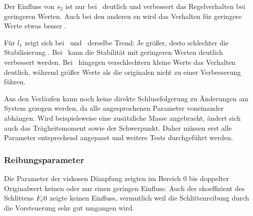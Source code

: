 Der Einfluss von $s_2$ ist nur bei \apd\ deutlich und verbessert das Regelverhalten bei geringeren Werten.
Auch bei den anderen \ap en wird das Verhalten für geringere Werte etwas besser .

Für $l_1$ zeigt sich bei \apz\ und \apd\ derselbe Trend: Je größer, desto schlechter die Stabilisierung .
Bei \apz\ kann die Stabilität mit geringeren Werten deutlich verbessert werden.
Bei \apv\ hingegen verschlechtern kleine Werte das Verhalten deutlich, während größer Werte als die originalen nicht zu einer Verbesserung führen.

Aus den Verläufen kann noch keine direkte Schlussfolgerung zu Änderungen am System gezogen werden, da alle angesprochenen Parameter voneinander abhängen.
Wird beispielsweise eine zusätzliche Masse angebracht, ändert sich auch das Trägheitsmoment sowie der Schwerpunkt.
Daher müssen erst alle Parameter entsprechend angepasst und weitere Tests durchgeführt werden.


\subsubsection{Reibungsparameter}

Die Parameter der viskosen Dämpfung zeigten im Bereich 0 bis doppelter Originalwert keinen oder nur einen geringen Einfluss.
Auch der \crb skoeffizient des Schlittens $F_c0$ zeigte keinen Einfluss, vermutlich weil die Schlittenreibung durch die Vorsteuerung sehr gut umgangen wird.



